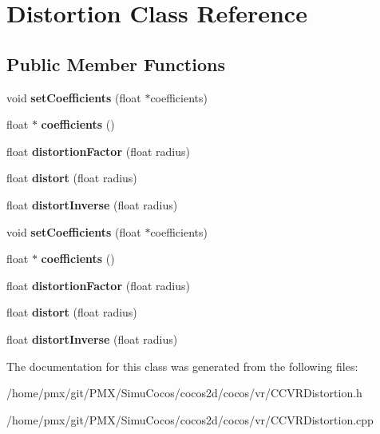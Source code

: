 \hypertarget{classDistortion}{}\section{Distortion Class Reference}
\label{classDistortion}
\subsection*{Public Member Functions}
\begin{DoxyCompactItemize}
\item 
\mbox{\label{classDistortion_a6454b056440b266608f93da7d1dc06f7}} 
void {\bfseries set\+Coefficients} (float $\ast$coefficients)
\item 
\mbox{\label{classDistortion_a9ba1d4859721843c16cc7a227b08f013}} 
float $\ast$ {\bfseries coefficients} ()
\item 
\mbox{\label{classDistortion_a067b4c8fb6e19365f1da5ed013bb6c46}} 
float {\bfseries distortion\+Factor} (float radius)
\item 
\mbox{\label{classDistortion_aaa80541b138ce063d8053cec569a03cd}} 
float {\bfseries distort} (float radius)
\item 
\mbox{\label{classDistortion_ad283d916a1ac99ca21e83713d359390f}} 
float {\bfseries distort\+Inverse} (float radius)
\item 
\mbox{\label{classDistortion_a6454b056440b266608f93da7d1dc06f7}} 
void {\bfseries set\+Coefficients} (float $\ast$coefficients)
\item 
\mbox{\label{classDistortion_ae8cb56e11fbd5dd1b43d28e983f3f2c5}} 
float $\ast$ {\bfseries coefficients} ()
\item 
\mbox{\label{classDistortion_a067b4c8fb6e19365f1da5ed013bb6c46}} 
float {\bfseries distortion\+Factor} (float radius)
\item 
\mbox{\label{classDistortion_aaa80541b138ce063d8053cec569a03cd}} 
float {\bfseries distort} (float radius)
\item 
\mbox{\label{classDistortion_ad283d916a1ac99ca21e83713d359390f}} 
float {\bfseries distort\+Inverse} (float radius)
\end{DoxyCompactItemize}


The documentation for this class was generated from the following files\+:\begin{DoxyCompactItemize}
\item 
/home/pmx/git/\+P\+M\+X/\+Simu\+Cocos/cocos2d/cocos/vr/C\+C\+V\+R\+Distortion.\+h\item 
/home/pmx/git/\+P\+M\+X/\+Simu\+Cocos/cocos2d/cocos/vr/C\+C\+V\+R\+Distortion.\+cpp\end{DoxyCompactItemize}
